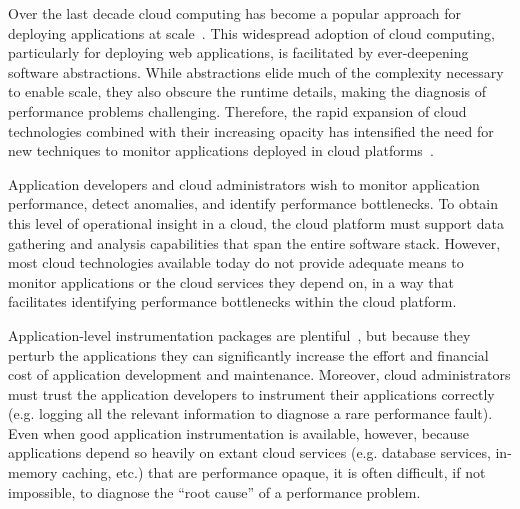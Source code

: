 Over the last decade cloud computing has become a popular approach for
deploying applications at
scale~\cite{Antonopoulos:2010:CCP:1855007,Pinheiro:2014:ACC:2618168.2618188}.
This widespread adoption of cloud computing, particularly for deploying web
applications, is facilitated by ever-deepening software abstractions.  While
abstractions elide much of 
the complexity necessary to enable scale, they also obscure
the runtime details, making the diagnosis of performance
problems challenging.  Therefore, the rapid expansion of cloud technologies
combined with their increasing opacity has intensified the need for new
techniques to monitor applications deployed in cloud
platforms~\cite{DaCunhaRodrigues:2016:MCC:2851613.2851619}. 

Application developers and cloud administrators wish to monitor
application performance, detect anomalies, and identify performance 
bottlenecks. To
obtain this level of operational insight in a cloud,
the cloud platform must support data gathering and analysis capabilities that
span the entire software stack.  However, most cloud technologies
available today do not provide adequate means to monitor applications or the cloud
services they depend on, in a way that facilitates identifying performance bottlenecks
within the cloud platform.

Application-level instrumentation packages are
plentiful~\cite{newrelic,datadog,dynatrace}, but because they perturb the
applications they can significantly increase the
effort and financial cost of application development and maintenance.  Moreover, cloud
administrators must trust the application developers to instrument their
applications correctly (e.g. logging all the relevant 
information to diagnose a rare performance fault).  Even when good application
instrumentation is available, however, because applications depend 
so heavily on
extant cloud services (e.g. database services, in-memory caching, etc.) that
are performance opaque,
it is often difficult, if not impossible, to diagnose
the ``root cause'' of a performance problem.


